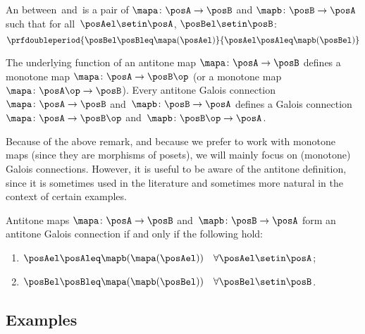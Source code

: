 \begin{ctdefinition}\label{def:antitone-galois-connection}
    An  between~\posA and~\posB is a pair of  $\mapa\colon \posA\to \posB$ and $\mapb \colon \posB\to \posA$ such that for all~$\posAel\setin \posA$, $\posBel\setin \posB$:
    \begin{equation}
        \prfdoubleperiod{\posBel \posBleq \mapa(\posAel)}{\posAel \posAleq \mapb(\posBel)}
    \end{equation}
\end{ctdefinition}

\begin{remark}\label{rem:not-focusing-on-antitone-Galois-connections}
The underlying function of an antitone map $\mapa\colon \posA\to \posB$ defines a monotone map $\mapa\colon \posA\to \posB\op$ (or a monotone map $\mapa \colon \posA \op \to \posB$). Every antitone Galois connection $\mapa \colon \posA \to \posB$ and~$\mapb \colon \posB \to \posA$ defines a Galois connection $\mapa \colon \posA \to \posB\op$ and~$\mapb \colon \posB\op \to \posA$. 
\end{remark}

Because of the above remark, and because we prefer to work with monotone maps (since they are morphisms of posets), we will mainly focus on (monotone) Galois connections. However, it is useful to be aware of the antitone definition, since it is sometimes used in the literature and sometimes more natural in the context of certain examples.  

\begin{lemma}\label{lem:alternative-def-antitone-Galois-connection}
Antitone maps $\mapa\colon \posA\to \posB$ and~$\mapb\colon \posB\to \posA$ form an antitone Galois connection if and only if the following hold: 
\begin{enumerate}
\item $\posAel\posAleq \mapb(\mapa(\posAel)) \quad \forall \posAel\setin \posA$;
\item $\posBel\posBleq \mapa(\mapb(\posBel)) \quad \forall \posBel\setin \posB$. 
\end{enumerate}
\end{lemma}


\subsection{Examples}


